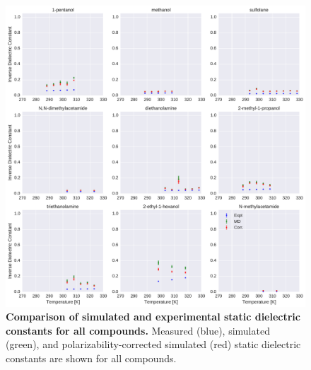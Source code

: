 \documentclass[aip, jcp, reprint]{revtex4-1}  %
\begin{document}
\begin{figure}[alldielectric]

\ContinuedFloat

\includegraphics[width=\textwidth]{./figures/dielectric_versus_temperature_part2.pdf}

\caption{{\bf Comparison of simulated and experimental static dielectric constants for all compounds.}
Measured (blue), simulated (green), and polarizability-corrected simulated (red) static dielectric constants are shown for all compounds.
}

\label{figure:AllDielectrics}

\end{figure}
\end{document}
